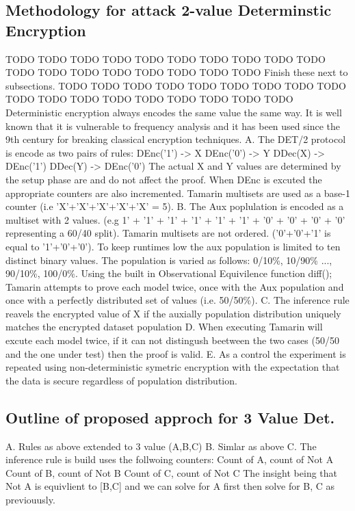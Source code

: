 \documentclass[journal]{IEEEtran}
\begin{document}
\subsection{Methodology for attack 2-value Determinstic Encryption}
TODO TODO TODO TODO TODO TODO TODO TODO TODO TODO TODO TODO TODO TODO TODO TODO TODO TODO
Finish these next to subsections.
TODO TODO TODO TODO TODO TODO TODO TODO TODO TODO TODO TODO TODO TODO TODO TODO TODO TODO
Deterministic encryption always encodes the same value the same way. It is well known that it is vulnerable to frequency analysis and it has been used since the 9th century\cite{Arab} for breaking classical  encryption techniques.
A. The DET/2 protocol is encode as two pairs of rules:
	DEnc('1') -> X
	DEnc('0') -> Y
	DDec(X) ->  DEnc('1')
	DDec(Y) ->  DEnc('0')
	The actual X and Y values are determined by the setup phase are and do not affect the proof.
	When DEnc is excuted the appropriate counters are also incremented. Tamarin multisets are used as a base-1 counter (i.e 'X'+'X'+'X'+'X'+'X' = 5).
B. The Aux poplulation is encoded as a multiset with 2 values. (e.g 1' + '1' + '1' + '1' + '1' + '1' + '0' + '0' + '0' + '0' representing a 60/40 split). Tamarin multisets are not ordered. ('0'+'0'+'1' is equal to '1'+'0'+'0'). To keep runtimes low the aux population is limited to ten distinct binary values.
The population is varied as follows: 0/10\%, 10/90\% ..., 90/10\%, 100/0\%. 
Using the built in Observational Equivilence function diff(); Tamarin attempts to prove each model twice, once with the Aux population and once with a perfectly distributed set of values (i.e. 50/50\%). 
C. The inference rule reavels the encrypted value of X if the auxially population distribution uniquely matches the encrypted dataset population
D. When executing Tamarin will excute each model twice, if it can not distingush beetween the two cases (50/50 and the one under test) then the proof is valid.
E. As a control the experiment is repeated using non-deterministic symetric encryption with the expectation that the data is secure regardless of population distribution.

\subsection{Outline of proposed approch for 3 Value Det.}
A. Rules as above extended to 3 value (A,B,C)
B. Simlar as above
C. The inference rule is build uses the follwoing counters:
		Count of A, count of Not A
		Count of B, count of Not B
		Count of C, count of Not C
The insight being that Not A is equivlient to  [B,C] and we can solve for A first then solve for B, C as previouusly.
\end{document}
